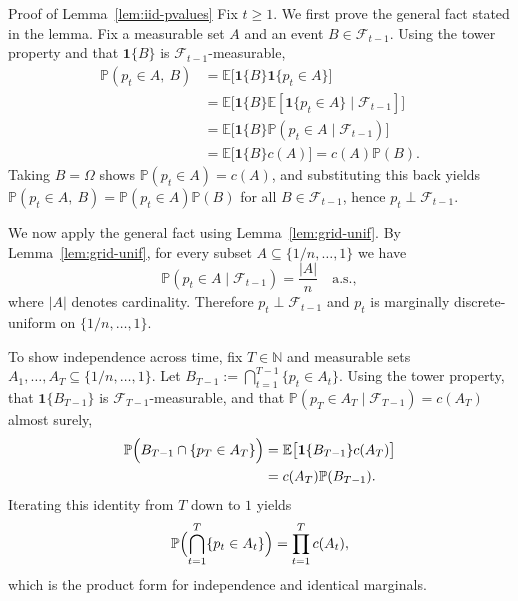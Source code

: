 \documentclass{uai2026} %
\newcommand{\N}{\mathbb{N}}
\newcommand{\1}{\mathbf{1}}
\newcommand{\ind}[1]{\mathbf{1}\{#1\}}
\newcommand{\prob}{\mathbb{P}}
\newcommand{\expec}{\mathbb{E}}
\newcommand{\F}{\mathcal{F}}
\begin{document}
\begin{appendixproof}{Proof of Lemma~\ref{lem:iid-pvalues}}
  Fix $t\ge 1$.
  We first prove the general fact stated in the lemma.
  Fix a measurable set $A$ and an event $B\in\F_{t-1}$.
  Using the tower property and that $\ind{B}$ is $\F_{t-1}$-measurable,
  \begin{equation*}
    \begin{aligned}
      \prob(p_{t}\in A,\ B)
      &=
      \expec\bigl[\ind{B}\ind{p_{t}\in A}\bigr]\\
      &=
      \expec\bigl[\ind{B}\expec[\ind{p_{t}\in A}\mid \F_{t-1}]\bigr]\\
      &=
      \expec\bigl[\ind{B}\prob(p_{t}\in A\mid \F_{t-1})\bigr]\\
      &=
      \expec\bigl[\ind{B}c(A)\bigr]
      =
      c(A)\prob(B).
    \end{aligned}
  \end{equation*}
  Taking $B=\Omega$ shows $\prob(p_{t}\in A)=c(A)$, and substituting this back yields
  $\prob(p_{t}\in A,\ B)=\prob(p_{t}\in A)\prob(B)$ for all $B\in\F_{t-1}$, hence $p_{t}\perp \F_{t-1}$.

  We now apply the general fact using Lemma~\ref{lem:grid-unif}.
  By Lemma~\ref{lem:grid-unif}, for every subset $A\subseteq\{1/n,\dots,1\}$ we have
  \begin{equation*}
    \prob(p_{t}\in A\mid \F_{t-1}) = \frac{|A|}{n}\quad \text{a.s.},
  \end{equation*}
  where $|A|$ denotes cardinality.
  Therefore $p_{t}\perp \F_{t-1}$ and $p_{t}$ is marginally discrete-uniform on $\{1/n,\dots,1\}$.

  To show independence across time, fix $T\in\N$ and measurable sets $A_{1},\dots,A_{T}\subseteq\{1/n,\dots,1\}$.
  Let $B_{T-1}:=\bigcap_{t=1}^{T-1}\{p_{t}\in A_{t}\}$.
  Using the tower property, that $\ind{B_{T-1}}$ is $\F_{T-1}$-measurable, and that $\prob(p_{T}\in A_{T}\mid \F_{T-1})=c(A_{T})$ almost surely,
  \begin{equation*}
    \begin{aligned}
      \prob\Bigl(B_{T-1}\cap\{p_{T}\in A_{T}\}\Bigr)
      &=
      \expec\bigl[\ind{B_{T-1}}c(A_{T})\bigr]\\
      &=
      c(A_{T})\prob(B_{T-1}).
    \end{aligned}
  \end{equation*}
  Iterating this identity from $T$ down to $1$ yields
  \begin{equation*}
    \prob\Bigl(\bigcap_{t=1}^{T}\{p_{t}\in A_{t}\}\Bigr) = \prod_{t=1}^{T} c(A_{t}),
  \end{equation*}
  which is the product form for independence and identical marginals.
\end{appendixproof}
\end{document}
